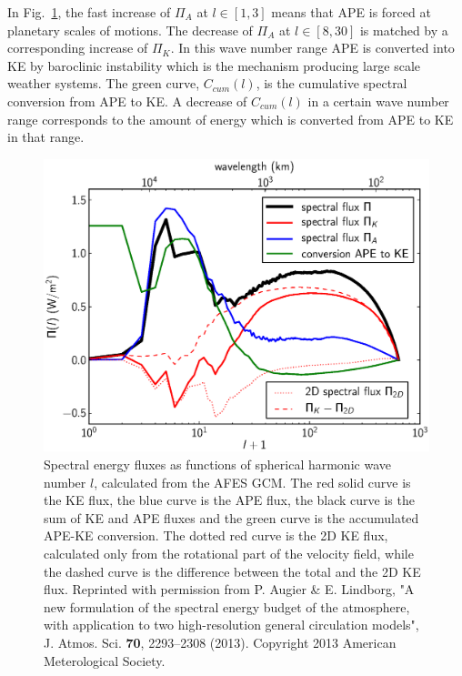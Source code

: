 In Fig.~\ref{Flux}, the fast increase of $ \Pi_A $  at  $ l \in [1, 3] $ means that  APE is forced at planetary scales of motions. The decrease of $ \Pi_A $ at $ l \in [8, 30] $ is matched by a corresponding increase of $ \Pi_K $. In this wave number range APE is converted into KE by baroclinic instability \citep{Vallis:book} which is the mechanism producing large scale weather systems.  The green curve, $ C_{cum}(l) $,  is the cumulative spectral conversion from APE to KE. A decrease of $ C_{cum}(l) $ in a certain wave number range corresponds to the amount of energy which is converted from APE to KE in that range. 

\begin{figure}[h]
\centerline{\includegraphics[angle=0,width=11.5cm]{./fig1.eps}}
 \caption{Spectral energy fluxes as functions of spherical harmonic wave number $ l $, calculated from the AFES GCM. The red solid curve is the KE flux, the blue curve is the APE flux, the black curve is the sum of KE and APE fluxes and the green curve is the accumulated APE-KE conversion. The dotted red curve is the 2D KE flux, calculated only from the rotational part of the velocity field, while the dashed curve is the difference between the total and the 2D KE flux. 
Reprinted
with permission from P. Augier \& E. Lindborg, 
"A new formulation of the spectral energy budget of the atmosphere, with application to two high-resolution general circulation models", 
J. Atmos. Sci. \textbf{70}, 2293--2308 (2013).
Copyright 2013 American Meterological Society.
}
 \label{Flux}
 \end{figure}


